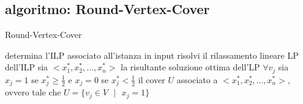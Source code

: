 
\subsection*{algoritmo: Round-Vertex-Cover}
\begin{flushleft}
	\begin{algorithm}
		\caption{Round-Vertex-Cover}
		\begin{algorithmic}
			\STATE determina l'ILP associato all'istanza in input
			\STATE risolvi il rilassamento lineare LP dell'ILP
			\STATE sia $<x_1^*,x_2^*,\ldots,x_n^*>$ la risultante soluzione ottima dell'LP
			\STATE $\forall v_j$ sia $x_j=1$ se $x_j^*\geq\frac{1}{2}$ e $x_j=0$ se $x_j^*<\frac{1}{2}$
			\RETURN il cover $U$ associato a $<x_1^*,x_2^*,\ldots,x_n^*>$, ovvero tale che $U=\{v_j\in V\text{ }\vert\text{ }x_j=1\}$
		\end{algorithmic}
	\end{algorithm}
\end{flushleft}


